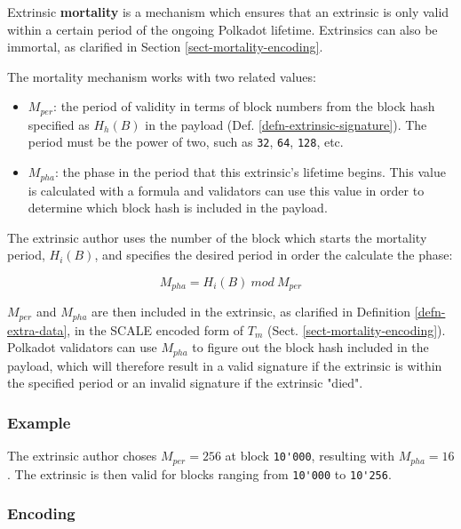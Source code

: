 \begin{definition}
    \label{defn-extrinsic-mortality}
    Extrinsic \textbf{mortality} is a mechanism which ensures that an extrinsic
    is only valid within a certain period of the ongoing Polkadot lifetime.
    Extrinsics can also be immortal, as clarified in Section
    \ref{sect-mortality-encoding}.
    \newline

    The mortality mechanism works with two related values:

    \begin{itemize}
        \item $M_{per}$: the period of validity in terms of block numbers from
        the block hash specified as $H_h(B)$ in the payload (Def.
        \ref{defn-extrinsic-signature}). The period must be the power of two,
        such as \verb|32|, \verb|64|, \verb|128|, etc.
        \item $M_{pha}$: the phase in the period that this extrinsic's lifetime
        begins. This value is calculated with a formula and validators can use
        this value in order to determine which block hash is included in the
        payload.
    \end{itemize}

    The extrinsic author uses the number of the block which starts the mortality
    period, $H_i(B)$, and specifies the desired period in order the calculate
    the phase:

    \[
        M_{pha} = H_i(B)\ mod\ M_{per}
    \]

    $M_{per}$ and $M_{pha}$ are then included in the extrinsic, as clarified in
    Definition \ref{defn-extra-data}, in the SCALE encoded form of $T_m$ (Sect.
    \ref{sect-mortality-encoding}). Polkadot validators can use $M_{pha}$
    to figure out the block hash included in the payload, which will therefore
    result in a valid signature if the extrinsic is within the specified period 
    or an invalid signature if the extrinsic "died".

    \subsubsection*{Example}

    The extrinsic author choses $M_{per} = 256$ at block \verb|10'000|,
    resulting with $M_{pha} = 16$. The extrinsic is then valid for blocks
    ranging from \verb|10'000| to \verb|10'256|.

    \subsubsection*{Encoding}\label{sect-mortality-encoding}


\end{definition}
